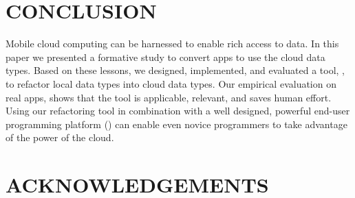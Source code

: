 \documentclass[article]{sigplanconf}
\begin{document}
\section{CONCLUSION}
\label{sec:conclusions}
Mobile cloud computing can be harnessed to enable rich access to data. 
In this paper we presented a formative study to convert \numFormative apps to use the \TD cloud data types. 
Based on these lessons, we designed, implemented, and evaluated a tool,  \tool,  to refactor local data types into cloud data types.  
Our empirical evaluation on \numScripts real apps, shows that the tool is applicable, relevant, and saves human effort.
Using our refactoring tool in combination with a well designed, powerful end-user programming platform (\TD) can enable even novice programmers to take advantage of the power of the cloud.


\section{ACKNOWLEDGEMENTS}





\end{document}
